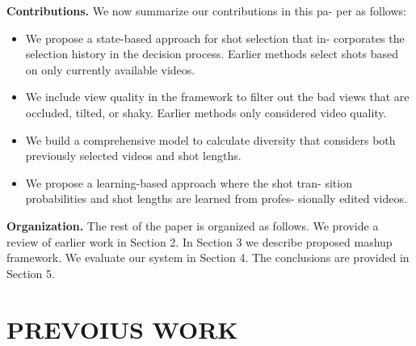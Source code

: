 \documentclass{new}
\begin{document}
\textbf{Contributions.} We now summarize our contributions in this pa-
per as follows:

\begin{itemize}
\item{We propose a state-based approach for shot selection that in-
corporates the selection history in the decision process. Earlier methods select shots based on only currently available
videos.}
\item We include view quality in the framework to filter out the
bad views that are occluded, tilted, or shaky. Earlier methods
only considered video quality.
\item We build a comprehensive model to calculate diversity that
considers both previously selected videos and shot lengths.

\item We propose a learning-based approach where the shot tran-
sition probabilities and shot lengths are learned from profes-
sionally edited videos.
\end{itemize}

\textbf{Organization.} The rest of the paper is organized as follows.
We provide a review of earlier work in Section 2. In Section 3 we
describe proposed mashup framework. We evaluate our system in
Section 4. The conclusions are provided in Section 5.

\section{PREVOIUS WORK}
\end{document}
